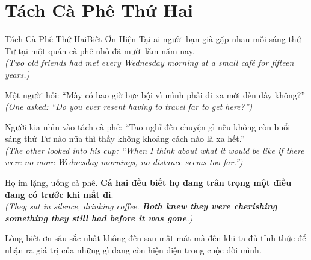 \section{Tách Cà Phê Thứ Hai}
\begin{truyen}{Tách Cà Phê Thứ Hai}{Biết Ơn Hiện Tại}
ai người bạn già gặp nhau mỗi sáng thứ Tư tại một quán cà phê nhỏ đã mười lăm năm nay.\\
\textit{(Two old friends had met every Wednesday morning at a small café for fifteen years.)}

Một người hỏi: ``Mày có bao giờ bực bội vì mình phải đi xa mới đến đây không?''\\
\textit{(One asked: ``Do you ever resent having to travel far to get here?'')}

Người kia nhìn vào tách cà phê: ``Tao nghĩ đến chuyện gì nếu không còn buổi sáng thứ Tư nào nữa thì thấy không khoảng cách nào là xa hết.''\\
\textit{(The other looked into his cup: ``When I think about what it would be like if there were no more Wednesday mornings, no distance seems too far.'')}

Họ im lặng, uống cà phê. \textbf{Cả hai đều biết họ đang trân trọng một điều đang có trước khi mất đi}.\\
\textit{(They sat in silence, drinking coffee. \textbf{Both knew they were cherishing something they still had before it was gone}.)}
\end{truyen}
\begin{baihoc}
  Lòng biết ơn sâu sắc nhất không đến sau mất mát mà đến khi ta đủ tỉnh thức để nhận ra giá trị của những gì đang còn hiện diện trong cuộc đời mình.
\end{baihoc}

